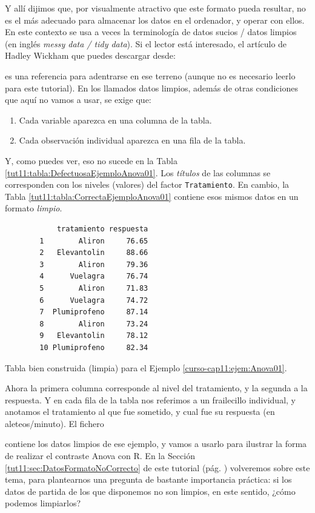 \documentclass[10pt,a4paper]{article}\usepackage[]{graphicx}\usepackage[]{color}
\newcounter {cont01}
\begin{document}
Y allí dijimos que, por visualmente atractivo que este formato pueda resultar, no es el más adecuado para almacenar los datos en el ordenador, y operar con ellos. En este contexto se usa a veces la terminología de {\sf datos sucios / datos limpios} (en inglés {\em messy data / tidy data}). Si el lector está interesado, el artículo de Hadley Wickham que puedes descargar desde:
\begin{center}
\end{center}
es una referencia para adentrarse en ese terreno (aunque no es necesario leerlo para este tutorial). En los llamados {\sf datos limpios}, además de otras condiciones que aquí no vamos a usar, se exige que:
\begin{enumerate}
  \item Cada variable aparezca en una columna de la tabla.
  \item Cada observación individual aparezca en una fila de la tabla.
\end{enumerate}
Y, como puedes ver, eso no sucede en la Tabla \ref{tut11:tabla:DefectuosaEjemploAnova01}. Los {\em títulos} de las columnas se corresponden con los niveles (valores) del factor {\tt Tratamiento}. En cambio, la Tabla \ref{tut11:tabla:CorrectaEjemploAnova01} contiene esos mismos datos en un formato {\em limpio}.
\begin{table}[ht]
{%
\begin{center}
\begin{minipage}{10cm}
\begin{verbatim}
            tratamiento respuesta
        1        Aliron     76.65
        2   Elevantolin     88.66
        3        Aliron     79.36
        4      Vuelagra     76.74
        5        Aliron     71.83
        6      Vuelagra     74.72
        7  Plumiprofeno     87.14
        8        Aliron     73.24
        9   Elevantolin     78.12
        10 Plumiprofeno     82.34
\end{verbatim}
\end{minipage}
\end{center}
}
\caption{Tabla bien construida (limpia) para el Ejemplo \ref{curso-cap11:ejem:Anova01}.}
\label{tut11:tabla:CorrectaEjemploAnova01}
\end{table}
Ahora la primera columna corresponde al nivel del tratamiento, y la segunda a la respuesta. Y en cada fila de la tabla nos referimos a un frailecillo individual, y anotamos el {\sf
tratamiento} al que fue sometido, y cual fue su {\sf respuesta} (en aleteos/minuto).  El fichero
\begin{center}
\end{center}
contiene los datos limpios de ese ejemplo, y vamos a usarlo para ilustrar la forma de realizar el contraste Anova con R.  En la Sección \ref{tut11:sec:DatosFormatoNoCorrecto} de este tutorial (pág. \pageref{tut11:sec:DatosFormatoNoCorrecto}) volveremos sobre este tema, para plantearnos una pregunta de bastante importancia práctica: si los datos de partida de los que disponemos no son limpios, en este sentido, ¿cómo podemos limpiarlos?
\end{document}
